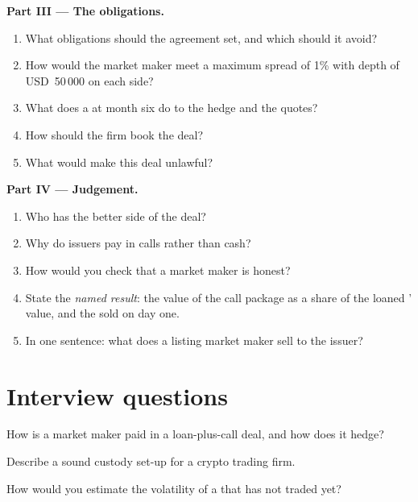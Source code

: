 \begin{problem}
\medskip\noindent\textbf{Part III --- The obligations.}
\begin{enumerate}[resume]
\item What obligations should the agreement set, and which should it avoid?
\item How would the market maker meet a maximum spread of 1\% with depth of USD~50\,000 on each side?
\item What does a  at month six do to the hedge and the quotes?
\item How should the firm book the deal?
\item What would make this deal unlawful?
\end{enumerate}

\medskip\noindent\textbf{Part IV --- Judgement.}
\begin{enumerate}[resume]
\item Who has the better side of the deal?
\item Why do issuers pay in calls rather than cash?
\item How would you check that a market maker is honest?
\item State the \emph{named result}: the value of the call package as a share of the loaned ' value, and the  sold on day one.
\item In one sentence: what does a listing market maker sell to the issuer?
\end{enumerate}
\end{problem}

\section{Interview questions}

\begin{interviewq}\label{iq:m3:the-crypto-trading-business:1}
How is a market maker paid in a loan-plus-call deal, and how does it hedge?
\end{interviewq}

\begin{interviewq}\label{iq:m3:the-crypto-trading-business:2}
Describe a sound custody set-up for a crypto trading firm.
\end{interviewq}

\begin{interviewq}\label{iq:m3:the-crypto-trading-business:3}
How would you estimate the volatility of a  that has not traded yet?
\end{interviewq}

